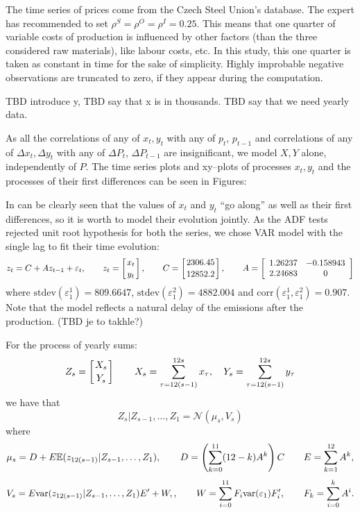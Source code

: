 \documentclass[3p,times]{elsarticle}
\begin{document}
The time series of prices come from the Czech Steel Union's database. The expert has recommended to set $\rho^S=\rho^O=\rho^I=0.25$. This means that one quarter of variable costs of production is influenced by other factors (than the three considered raw materials), like labour costs, etc. In this study, this one quarter is taken as constant in time for the sake of simplicity.  
Highly improbable negative observations are truncated to zero, if they appear during the computation. 


TBD introduce y, TBD say that x is in thousands. TBD say that we need yearly data.

As all the correlations of any of $x_t,y_t$ with any of $p_t$, $p_{t-1}$  and correlations of any of $\Delta x_t,\Delta y_t$ with any of $\Delta P_t$, $\Delta P_{t-1}$ are insignificant, we model $X,Y$ alone, independently of $P$. The time series plots and xy--plots of processes $x_t,y_t$ and the processes of their first differences can be seen in Figures:




In can be clearly seen that the values of $x_t$ and $y_t$ ``go along'' as well as their first differences, so it is worth to model their evolution jointly. As the ADF tests rejected unit root hypothesis for both the series, we chose VAR model with the single lag to fit their time evolution:
\begin{equation}\label{xymodel}
z_t=C + A z_{t-1} + \varepsilon_t,\qquad 
z_t = \left[x_t \atop y_t\right],
\qquad C = \left[2306	.45\atop 12852.2\right],
\qquad 
A=\left[\begin{array}{cc}
1.26237 &  -0.158943\\
2.24683 & 0 
\end{array}\right]
\end{equation}
where $\mathrm{stdev}(\varepsilon^1_1)=809.6647$, $\mathrm{stdev}(\varepsilon^2_1)=4882.004$ and $\mathrm{corr}(\varepsilon^1_1,\varepsilon^2_1)=0.907$.  Note that the model reflects a natural delay of the emissions after the production. (TBD je to takhle?)

For the process of yearly sums:
$$
Z_s = \left[X_s\atop Y_s\right]
\qquad 
X_s = \sum_{\tau = 12(s-1)}^{12s} x_\tau,
\quad
Y_s =\sum_{\tau = 12(s-1)}^{12s} y_\tau
$$
we have that 
$$
Z_s|Z_{s-1},\dots,Z_1 = \mathcal{N}
\left(\mu_s,V_s\right)
$$
where
$$
\mu_s = D + E\mathbb{E}(z_{12(s-1)}|Z_{s-1},\dots,Z_1),
\qquad 
D 
=\left( \sum_{k=0}^{11} (12-k) A^k\right) C
\qquad 
E = \sum_{k=1}^{12} A^{k},
$$
$$
V_s = E\mathrm{var}(z_{12(s-1)}|Z_{s-1},\dots,Z_1)E'+W,,
\qquad
W = \sum_{i=0}^{11}F_{i}\mathrm{var}(\varepsilon_1)F'_{i},
\qquad 
F_k= \sum_{i=0}^k A^i.
$$
\end{document}
